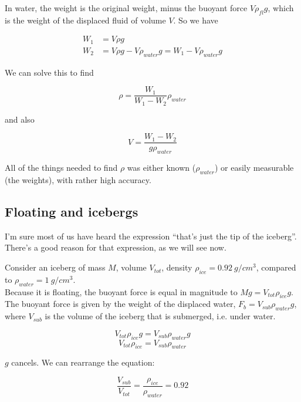 In water, the weight is the original weight, minus the buoyant force $V \rho_{fl} g$, which is the weight of the displaced fluid of volume $V$. So we have

\begin{align}
W_1 &= V \rho g\\
W_2 &= V \rho g - V \rho_{water} g = W_1 - V \rho_{water} g
\end{align}

We can solve this to find

\begin{equation}
\rho = \frac{W_1}{W_1 - W_2} \rho_{water}
\end{equation}

and also

\begin{equation}
V = \frac{W_1 - W_2}{g \rho_{water}}
\end{equation}

All of the things needed to find $\rho$ was either known ($\rho_{water}$) or easily measurable (the weights), with rather high accuracy.

\subsection{Floating and icebergs}

I'm sure most of us have heard the expression ``that's just the tip of the iceberg''. There's a good reason for that expression, as we will see now.

Consider an iceberg of mass $M$, volume $V_{tot}$, density $\rho_{ice} = \SI{0.92}{g/cm^3}$, compared to $\rho_{water} = \SI{1}{g/cm^3}$.\\
Because it is floating, the buoyant force is equal in magnitude to $M g = V_{tot} \rho_{ice} g$. The buoyant force is given by the weight of the displaced water, $F_b = V_{sub} \rho_{water} g$, where $V_{sub}$ is the volume of the iceberg that is submerged, i.e. under water.

\begin{equation}
V_{tot} \rho_{ice} g = V_{sub} \rho_{water} g
\end{equation}
\begin{equation}
V_{tot} \rho_{ice} = V_{sub} \rho_{water}
\end{equation}

$g$ cancels. We can rearrange the equation:

\begin{equation}
\frac{V_{sub}}{V_{tot}} = \frac{\rho_{ice}}{\rho_{water}} = 0.92
\end{equation}

